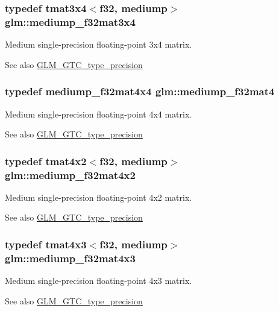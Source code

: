 \subsubsection[{mediump\+\_\+f32mat3x4}]{\setlength{\rightskip}{0pt plus 5cm}typedef tmat3x4$<${\bf f32}, mediump$>$ {\bf glm\+::mediump\+\_\+f32mat3x4}}\label{namespaceglm_a18d2daa4d554564626732c485bab6cff}
Medium single-\/precision floating-\/point 3x4 matrix. \begin{DoxySeeAlso}{See also}
\hyperlink{group__gtc__type__precision}{G\+L\+M\+\_\+\+G\+T\+C\+\_\+type\+\_\+precision} 
\end{DoxySeeAlso}
\hypertarget{namespaceglm_a56bd98ec31b6abc0315d688d4ecd94a0}{}
\subsubsection[{mediump\+\_\+f32mat4}]{\setlength{\rightskip}{0pt plus 5cm}typedef {\bf mediump\+\_\+f32mat4x4} {\bf glm\+::mediump\+\_\+f32mat4}}\label{namespaceglm_a56bd98ec31b6abc0315d688d4ecd94a0}
Medium single-\/precision floating-\/point 4x4 matrix. \begin{DoxySeeAlso}{See also}
\hyperlink{group__gtc__type__precision}{G\+L\+M\+\_\+\+G\+T\+C\+\_\+type\+\_\+precision} 
\end{DoxySeeAlso}
\hypertarget{namespaceglm_a539da8e36a7d6bb5fe20d6458a99056e}{}
\subsubsection[{mediump\+\_\+f32mat4x2}]{\setlength{\rightskip}{0pt plus 5cm}typedef tmat4x2$<${\bf f32}, mediump$>$ {\bf glm\+::mediump\+\_\+f32mat4x2}}\label{namespaceglm_a539da8e36a7d6bb5fe20d6458a99056e}
Medium single-\/precision floating-\/point 4x2 matrix. \begin{DoxySeeAlso}{See also}
\hyperlink{group__gtc__type__precision}{G\+L\+M\+\_\+\+G\+T\+C\+\_\+type\+\_\+precision} 
\end{DoxySeeAlso}
\hypertarget{namespaceglm_aba56c6b40c63228a05f2dcfe89caf336}{}
\subsubsection[{mediump\+\_\+f32mat4x3}]{\setlength{\rightskip}{0pt plus 5cm}typedef tmat4x3$<${\bf f32}, mediump$>$ {\bf glm\+::mediump\+\_\+f32mat4x3}}\label{namespaceglm_aba56c6b40c63228a05f2dcfe89caf336}
Medium single-\/precision floating-\/point 4x3 matrix. \begin{DoxySeeAlso}{See also}
\hyperlink{group__gtc__type__precision}{G\+L\+M\+\_\+\+G\+T\+C\+\_\+type\+\_\+precision} 
\end{DoxySeeAlso}
\hypertarget{namespaceglm_a3c3a55da431fd8deef6a4ce3bb3bda99}{}
